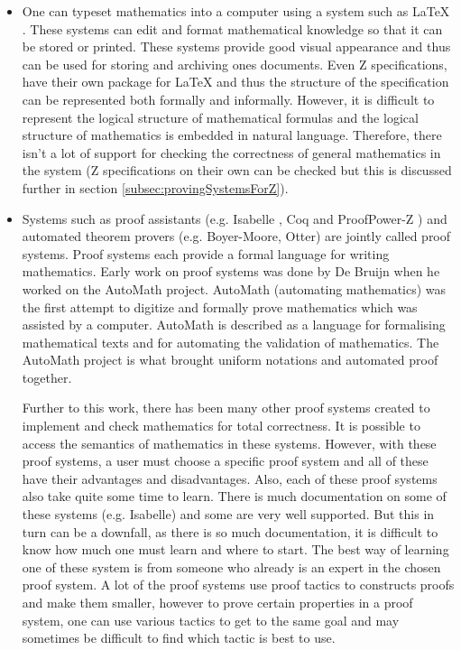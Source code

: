 \begin{itemize}
\item One can typeset mathematics into a computer using a system such as
\LaTeX{} \cite{latex} . These systems can edit and format mathematical knowledge
so that it can be stored or printed. These systems provide good visual
appearance and thus can be used for storing and archiving ones documents. Even Z
specifications, have their own package for \LaTeX{} and thus the structure of the
specification can be represented both formally and informally. However, it is
difficult to represent the logical structure of mathematical formulas and the
logical structure of mathematics is embedded in natural language. Therefore,
there isn't a lot of support for checking the correctness of general mathematics
in the system (Z specifications on their own can be checked but this
is discussed further in section \ref{subsec:provingSystemsForZ}).

\item Systems such as proof assistants (e.g. Isabelle \cite{isabelle}, Coq
\cite{coq} and ProofPower-Z \cite{pp}) and automated theorem provers (e.g.
Boyer-Moore, Otter) are jointly called proof systems. Proof systems each provide
a formal language for writing mathematics. Early work on proof systems was done
by De Bruijn when he worked on the AutoMath \cite{selectedautomath} project.
AutoMath (automating mathematics) was the first attempt to digitize and formally
prove mathematics which was assisted by a computer. AutoMath is described as a
language for formalising mathematical texts and for automating the validation of
mathematics. The AutoMath project is what brought uniform notations and
automated proof together.

Further to this work, there has been many other proof systems created to
implement and check mathematics for total correctness. It is possible to access
the semantics of mathematics in these systems. However, with these proof
systems, a user must choose a specific proof system and all of these have their
advantages and disadvantages. Also, each of these proof systems also take quite
some time to learn. There is much documentation on some of these systems (e.g.
Isabelle) and some are very well supported. But this in turn can be a downfall,
as there is so much documentation, it is difficult to know how much one must
learn and where to start. The best way of learning one of these system is from
someone who already is an expert in the chosen proof system. A lot of the proof
systems use proof tactics to constructs proofs and make them smaller, however to
prove certain properties in a proof system, one can use various tactics to get
to the same goal and may sometimes be difficult to find which tactic is best to
use.


\end{itemize}
